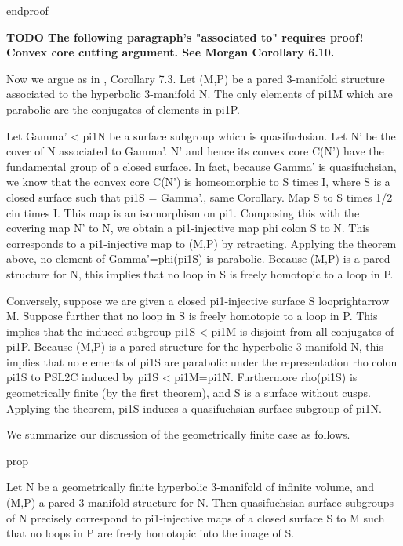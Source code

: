 endproof


\textbf{TODO The following paragraph's "associated to" requires proof! Convex
core cutting argument. See Morgan Corollary 6.10.}

Now we argue as in \cite{Mo}, Corollary 7.3. Let (M,P) be a pared 3-manifold
structure associated to the hyperbolic 3-manifold N. The only elements of pi1M
which are parabolic are the conjugates of elements in pi1P.

Let Gamma' < pi1N be a surface subgroup which is quasifuchsian. Let N' be the
cover of N associated to Gamma'. N' and hence its convex core C(N') have the
fundamental group of a closed surface. In fact, because Gamma' is
quasifuchsian, we know that the convex core C(N') is homeomorphic to S times I,
where S is a closed surface such that pi1S = Gamma'.\cite{Mo}, same Corollary.
Map S to S times 1/2 cin times I. This map is an isomorphism on pi1. Composing
this with the covering map N' to N, we obtain a pi1-injective map phi colon
S to N.  This corresponds to a pi1-injective map to (M,P) by retracting.
Applying the theorem above, no element of Gamma'=phi(pi1S) is parabolic.
Because (M,P) is a pared structure for N, this implies that no loop in S is
freely homotopic to a loop in P.

Conversely, suppose we are given a closed pi1-injective surface
S looprightarrow M.  Suppose further that no loop in S is freely homotopic to
a loop in P. This implies that the induced subgroup pi1S < pi1M is disjoint
from all conjugates of pi1P. Because (M,P) is a pared structure for the
hyperbolic 3-manifold N, this implies that no elements of pi1S are parabolic
under the representation rho colon pi1S to PSL2C induced by pi1S < pi1M=pi1N.
Furthermore rho(pi1S) is geometrically finite (by the first theorem), and S is
a surface without cusps.  Applying the theorem, pi1S induces a quasifuchsian
surface subgroup of pi1N.

We summarize our discussion of the geometrically finite case as follows.

prop

Let N be a geometrically finite hyperbolic 3-manifold of infinite volume, and
(M,P) a pared 3-manifold structure for N. Then quasifuchsian surface subgroups
of N precisely correspond to pi1-injective maps of a closed surface S to M such
that no loops in P are freely homotopic into the image of S.


